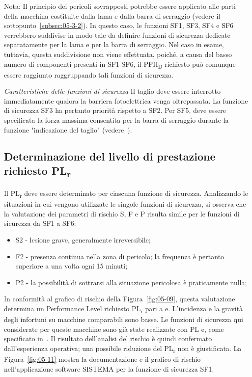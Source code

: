 Nota: Il principio dei pericoli sovrapposti potrebbe essere applicato alle parti della macchina costituite dalla lama e dalla barra di serraggio (vedere il sottopunto~\ref{subsec:05-3-2}). In questo caso, le funzioni SF1, SF3, SF4 e SF6 verrebbero suddivise in modo tale da definire funzioni di sicurezza dedicate separatamente per la lama e per la barra di serraggio. Nel caso in esame, tuttavia, questa suddivisione non viene effettuata, poiché, a causa del basso numero di componenti presenti in SF1-SF6, il PFH\textsubscript{D} richiesto può comunque essere raggiunto raggruppando tali funzioni di sicurezza.

\textit{Caratteristiche delle funzioni di sicurezza}
Il taglio deve essere interrotto immediatamente qualora la barriera fotoelettrica venga oltrepassata. La funzione di sicurezza SF3 ha pertanto priorità rispetto a SF2. Per SF5, deve essere specificata la forza massima consentita per la barra di serraggio durante la funzione "indicazione del taglio" (vedere~\cite{en1010-3}).

\subsection{Determinazione del livello di prestazione richiesto \texorpdfstring{PL\textsubscript{r}}{PLr}}
\label{subsec:05-7-4}
Il PL\textsubscript{r} deve essere determinato per ciascuna funzione di sicurezza. Analizzando le situazioni in cui vengono utilizzate le singole funzioni di sicurezza, si osserva che la valutazione dei parametri di rischio S, F e P risulta simile per le funzioni di sicurezza da SF1 a SF6:
	\begin{itemize}
    \item S2 - lesione grave, generalmente irreversibile;
    \item F2 - presenza continua nella zona di pericolo; la frequenza è pertanto superiore a una volta ogni 15 minuti;
    \item P2 - la possibilità di sottrarsi alla situazione pericolosa è praticamente nulla;
\end{itemize}

In conformità al grafico di rischio della Figura~\ref{fig:05-09}, questa valutazione determina un Performance Level richiesto PL\textsubscript{r} pari a e. L'incidenza e la gravità degli infortuni su macchine comparabili sono basse. Le funzioni di sicurezza qui considerate per queste macchine sono già state realizzate con PL e, come specificato in~\cite{en1010-1}. Il risultato dell'analisi del rischio è quindi confermato dall'esperienza operativa; una possibile riduzione del PL\textsubscript{r} non è giustificata. La Figura~\ref{fig:05-11} mostra la documentazione e il grafico di rischio nell'applicazione software SISTEMA per la funzione di sicurezza SF1.

